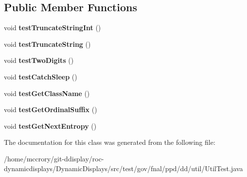 \subsection*{Public Member Functions}
\begin{DoxyCompactItemize}
\item 
\hypertarget{classtest_1_1gov_1_1fnal_1_1ppd_1_1dd_1_1util_1_1UtilTest_ab96943ae8a566fd4b7a0e898a7cd7d43}{void {\bfseries test\-Truncate\-String\-Int} ()}\label{classtest_1_1gov_1_1fnal_1_1ppd_1_1dd_1_1util_1_1UtilTest_ab96943ae8a566fd4b7a0e898a7cd7d43}

\item 
\hypertarget{classtest_1_1gov_1_1fnal_1_1ppd_1_1dd_1_1util_1_1UtilTest_a0230d77afa30735fb3f9ae40dc3e58fb}{void {\bfseries test\-Truncate\-String} ()}\label{classtest_1_1gov_1_1fnal_1_1ppd_1_1dd_1_1util_1_1UtilTest_a0230d77afa30735fb3f9ae40dc3e58fb}

\item 
\hypertarget{classtest_1_1gov_1_1fnal_1_1ppd_1_1dd_1_1util_1_1UtilTest_a7cf05597cbf29ca2f49f8acb84aca276}{void {\bfseries test\-Two\-Digits} ()}\label{classtest_1_1gov_1_1fnal_1_1ppd_1_1dd_1_1util_1_1UtilTest_a7cf05597cbf29ca2f49f8acb84aca276}

\item 
\hypertarget{classtest_1_1gov_1_1fnal_1_1ppd_1_1dd_1_1util_1_1UtilTest_ae7e701f1f7c699e905e7fe6fde2f8969}{void {\bfseries test\-Catch\-Sleep} ()}\label{classtest_1_1gov_1_1fnal_1_1ppd_1_1dd_1_1util_1_1UtilTest_ae7e701f1f7c699e905e7fe6fde2f8969}

\item 
\hypertarget{classtest_1_1gov_1_1fnal_1_1ppd_1_1dd_1_1util_1_1UtilTest_a824964e9a30eb87959166de898644c34}{void {\bfseries test\-Get\-Class\-Name} ()}\label{classtest_1_1gov_1_1fnal_1_1ppd_1_1dd_1_1util_1_1UtilTest_a824964e9a30eb87959166de898644c34}

\item 
\hypertarget{classtest_1_1gov_1_1fnal_1_1ppd_1_1dd_1_1util_1_1UtilTest_a488770a4b8fad085ef14f836b3421b80}{void {\bfseries test\-Get\-Ordinal\-Suffix} ()}\label{classtest_1_1gov_1_1fnal_1_1ppd_1_1dd_1_1util_1_1UtilTest_a488770a4b8fad085ef14f836b3421b80}

\item 
\hypertarget{classtest_1_1gov_1_1fnal_1_1ppd_1_1dd_1_1util_1_1UtilTest_a59dcf291281cba49a63d64423941b303}{void {\bfseries test\-Get\-Next\-Entropy} ()}\label{classtest_1_1gov_1_1fnal_1_1ppd_1_1dd_1_1util_1_1UtilTest_a59dcf291281cba49a63d64423941b303}

\end{DoxyCompactItemize}


The documentation for this class was generated from the following file\-:\begin{DoxyCompactItemize}
\item 
/home/mccrory/git-\/ddisplay/roc-\/dynamicdisplays/\-Dynamic\-Displays/src/test/gov/fnal/ppd/dd/util/Util\-Test.\-java\end{DoxyCompactItemize}
